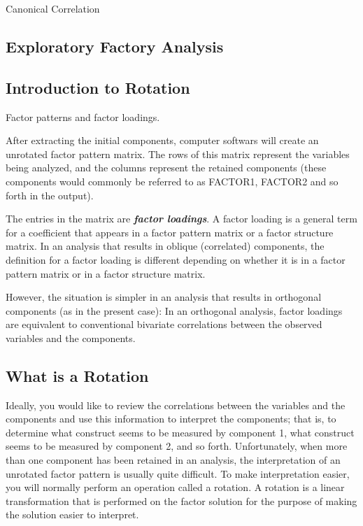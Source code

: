 Canonical Correlation


\subsection{Exploratory Factory Analysis}



\subsection{Introduction to Rotation}


Factor patterns and factor loadings.

After extracting the initial components, computer softwars
will create an unrotated factor pattern matrix. The rows of this matrix represent the variables
being analyzed, and the columns represent the retained components (these components would commonly be
referred to as FACTOR1, FACTOR2 and so forth in the output).

The entries in the matrix are \textbf{\emph{factor loadings}}. A factor loading is a general term for a coefficient
that appears in a factor pattern matrix or a factor structure matrix. In an analysis that results in
oblique (correlated) components, the definition for a factor loading is different depending on
whether it is in a factor pattern matrix or in a factor structure matrix.

However, the situation is simpler in an analysis that results in orthogonal components (as in the present case): In an
orthogonal analysis, factor loadings are equivalent to conventional bivariate correlations between the observed
variables and the components.

\subsection{What is a Rotation}

Ideally, you would like to review the correlations between the variables and the
components and use this information to interpret the components; that is, to determine what
construct seems to be measured by component 1, what construct seems to be measured by
component 2, and so forth. Unfortunately, when more than one component has been retained in
an analysis, the interpretation of an unrotated factor pattern is usually quite difficult. To make
interpretation easier, you will normally perform an operation called a rotation. A rotation is a
linear transformation that is performed on the factor solution for the purpose of making the
solution easier to interpret.

